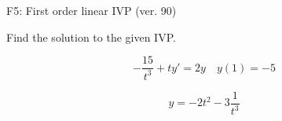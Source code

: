\begin{exercise}
  \begin{exerciseTitle}F5: First order linear IVP (ver. 90)\end{exerciseTitle}
  \begin{exerciseStatement}
    
Find the solution to the given IVP.

    
\[-\frac{15}{t^{3}} +ty'= 2 y \hspace{1em} y( 1 ) = -5\]

  \end{exerciseStatement}
  \begin{exerciseAnswer}
    
\[y= -2 t^ 2 -3 \frac{1}{t^{3}}\]

  \end{exerciseAnswer}
\end{exercise}